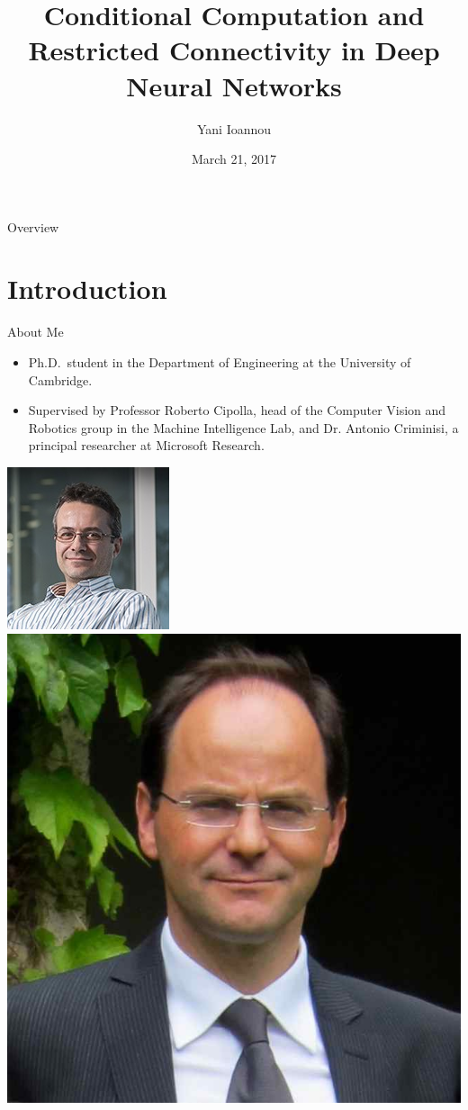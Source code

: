 \documentclass[t,xcolor=dvipsnames]{beamer}
\title[Conditional Computation and Restricted Connectivity in Deep Neural Networks] %
{Conditional Computation and Restricted Connectivity in Deep Neural Networks}
\author[Yani Ioannou]
{Yani Ioannou}
\institute[University of Cambridge] %
{University of Cambridge}
\date{March 21, 2017}
\begin{document}


\begin{frame}
  \titlepage
\end{frame}






\begin{frame}{Overview}
\tableofcontents
\end{frame}


\section{Introduction}

\begin{frame}{About Me}
\begin{itemize}
\item Ph.D.\ student in the Department of Engineering at the University of Cambridge.
\item Supervised by Professor Roberto Cipolla, head of the Computer Vision and Robotics group in the Machine Intelligence Lab, and Dr. Antonio Criminisi, a principal researcher at Microsoft Research.
\end{itemize}
\centering
\includegraphics[width=0.207\linewidth]{antonio}~
\includegraphics[width=0.2\linewidth]{roberto}
\end{frame}
\end{document}
